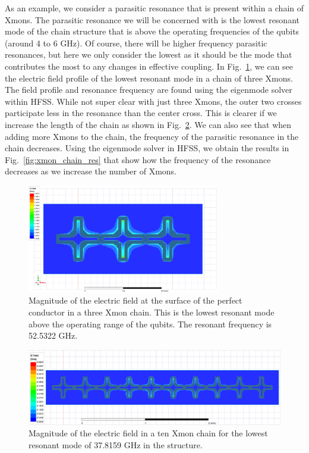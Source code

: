 As an example, we consider a parasitic resonance that is present within a chain of Xmons. The parasitic resonance we will be concerned with is the lowest resonant mode of the chain structure that is above the operating frequencies of the qubits (around 4 to 6 GHz). Of course, there will be higher frequency parasitic resonances, but here we only consider the lowest as it should be the mode that contributes the most to any changes in effective coupling. In Fig.\ \ref{fig:xmon_1x3_eig}, we can see the electric field profile of the lowest resonant mode in a chain of three Xmons. The field profile and resonance frequency are found using the eigenmode solver within HFSS. While not super clear with just three Xmons, the outer two crosses participate less in the resonance than the center cross. This is clearer if we increase the length of the chain as shown in Fig.\ \ref{fig:xmon_1x10_eig}. We can also see that when adding more Xmons to the chain, the frequency of the parasitic resonance in the chain decreases. Using the eigenmode solver in HFSS, we obtain the results in Fig.\ \ref{fig:xmon_chain_res} that show how the frequency of the resonance decreases as we increase the number of Xmons.
\begin{figure}[h!]
    \centering
    \includegraphics[width=0.75\textwidth]{figures/xmon_1x3_eig.png}
    \caption{Magnitude of the electric field at the surface of the perfect conductor in a three Xmon chain. This is the lowest resonant mode above the operating range of the qubits. The resonant frequency is 52.5322 GHz.}
    \label{fig:xmon_1x3_eig}
\end{figure}

\begin{figure}[h!]
    \centering
    \includegraphics[width=\textwidth]{figures/xmon_1x10_eig.png}
    \caption{Magnitude of the electric field in a ten Xmon chain for the lowest resonant mode of 37.8159 GHz in the structure.}
    \label{fig:xmon_1x10_eig}
\end{figure}

